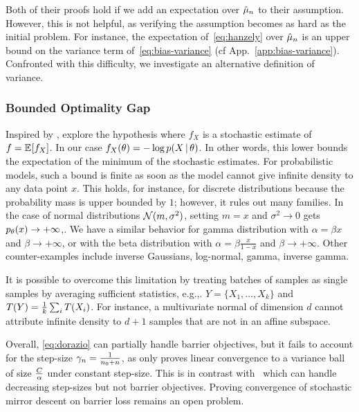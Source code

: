 Both of their proofs hold if we add an expectation over $\hat {\mu}_n$ to their assumption.
However, this is not helpful, as verifying the assumption becomes as hard as the initial problem.
For instance, the expectation of~\eqref{eq:hanzely} over $\hat {\mu}_n$ is an upper bound on the variance term of~\eqref{eq:bias-variance} (cf App.~\ref{app:bias-variance}).
Confronted with this difficulty, we investigate an alternative definition of variance.

\subsubsection{Bounded Optimality Gap}
Inspired by \citet{loizou2021stochastic}, \citet{dorazio2021stochastic} explore the hypothesis
where $f_X$ is a stochastic estimate of $f = \mathbb{E}_{} [ f_X ] $. In our case $f_X(\theta) = - \log p(X\,\vert\, \theta)$.
In other words, this lower bounds the expectation of the minimum of the stochastic estimates.
For probabilistic models, such a bound is finite as soon as the model cannot give infinite density to any data point $x$.
This holds, for instance, for discrete distributions because the probability mass is upper bounded by $1$; however, it rules out many families.
In the case of normal distributions ${\mathcal N}(m, \sigma^2)$, setting $m=x$ and $\sigma^2 \rightarrow 0$ gets $p_\theta (x) \rightarrow +\infty$,.
We have a similar behavior for gamma distribution with $\alpha = \beta x$ and $\beta \rightarrow +\infty$, or with the beta distribution with $\alpha=\beta \frac{x}{1-x}$ and $\beta \rightarrow +\infty$.
Other counter-examples include inverse Gaussians, log-normal, gamma, inverse gamma.

It is possible to overcome this limitation by treating batches of samples as single samples by averaging sufficient statistics, e.g.,. $Y = \{X_1, \dots, X_k\}$ and $T(Y) = \frac{1}{k}\sum_i T(X_i)$.
For instance, a multivariate normal of dimension $d$ cannot attribute infinite density to $d+1$ samples that are not in an affine subspace.

Overall, \eqref{eq:dorazio} can partially handle barrier objectives, but it fails to account for the step-size $\gamma_n = \frac{1}{n_0+n}$, as \citet[Thm.1]{dorazio2021stochastic} only proves linear convergence to a variance ball of size $\frac{C}{\alpha}$ under constant step-size.
This is in contrast with~\citet{dragomir2021fast} which can handle decreasing step-sizes but not barrier objectives.
Proving convergence of stochastic mirror descent on barrier loss remains an open problem.

